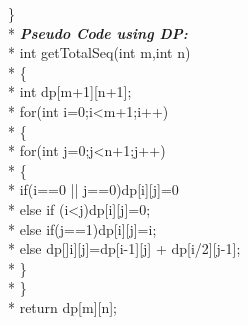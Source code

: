 \documentclass[12pt]{book}
\begin{document}
\} \\*
\newline
\newline
\textbf{\textit{Pseudo Code using DP:}} \\*
int getTotalSeq(int m,int n)\\*
\{ \\*
\phantom{x} \hspace{3ex}    int dp[m+1][n+1];\\*
\phantom{x} \hspace{3ex}    for(int i=0;i<m+1;i++)\\*
\phantom{x} \hspace{3ex}    \{ \\*
\phantom{x} \hspace{3ex}\phantom{x} \hspace{3ex}        for(int j=0;j<n+1;j++)\\*
\phantom{x} \hspace{3ex}\phantom{x} \hspace{3ex}        \{ \\*
\phantom{x} \hspace{3ex}\phantom{x} \hspace{3ex} \phantom{x} \hspace{3ex}           if(i==0 || j==0)dp[i][j]=0\\*
\phantom{x} \hspace{3ex}\phantom{x} \hspace{3ex} \phantom{x} \hspace{3ex}           else if (i<j)dp[i][j]=0;\\*
\phantom{x} \hspace{3ex}\phantom{x} \hspace{3ex} \phantom{x} \hspace{3ex}           else if(j==1)dp[i][j]=i;\\*
\phantom{x} \hspace{3ex}\phantom{x} \hspace{3ex} \phantom{x} \hspace{3ex}          else dp[]i][j]=dp[i-1][j] + dp[i/2][j-1];\\*
\phantom{x} \hspace{3ex} \phantom{x} \hspace{3ex}       \} \\*
\phantom{x} \hspace{3ex}    \} \\*
\phantom{x} \hspace{3ex} return dp[m][n];
\end{document}
